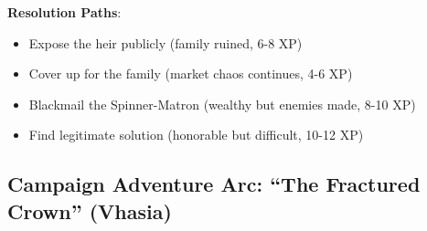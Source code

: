 \documentclass[11pt]{article}
\begin{document}
\begin{mdframed}[backgroundcolor=modulebg]
\textbf{Resolution Paths}:
\begin{itemize}[leftmargin=*]
\item Expose the heir publicly (family ruined, 6-8 XP)
\item Cover up for the family (market chaos continues, 4-6 XP)
\item Blackmail the Spinner-Matron (wealthy but enemies made, 8-10 XP)
\item Find legitimate solution (honorable but difficult, 10-12 XP)
\end{itemize}
\end{mdframed}

\subsection*{Campaign Adventure Arc: ``The Fractured Crown'' (Vhasia)}
\end{document}
